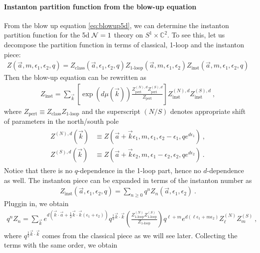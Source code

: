 \documentclass[letterpaper, 11pt]{article}
\def\IC{\mathbb{C}}
\def\CN{{\cal N}}
\def\e{\epsilon}
\def\half{\frac{1}{2}}
\begin{document}
\paragraph{Instanton partition function from the blow-up equation}
From the blow up equation \eqref{eq:blowup5d}, we can determine the instanton partition function for the 5d $\CN=1$ theory on $S^1 \times \IC^2$. To see this, let us decompose the partition function in terms of classical, 1-loop and the instanton piece:
\begin{align}
 Z(\vec{a}, m, \e_1, \e_2, q) = Z_{\textrm{class}}(\vec{a}, \e_1, \e_2, q) Z_{\textrm{1-loop}} (\vec{a}, m, \e_1, \e_2) Z_{\textrm{inst}}(\vec{a}, m, \e_1, \e_2, q)
\end{align}
Then the blow-up equation can be rewritten as
\begin{align}
 Z_{\textrm{inst}} = \sum_{\vec{k}} \left[ \exp\left( d \mu(\vec{k}) \right)  \frac{Z^{(N), d}_{\textrm{pert}} Z^{(S), d}_{\textrm{pert}}}{Z_{\textrm{pert}}} \right] Z^{(N), d}_{\textrm{inst}} Z^{(S), d}_{\textrm{inst}}  \ , 
\end{align}
where $Z_{\textrm{pert}} \equiv Z_{\textrm{class}} Z_{\textrm{1-loop}}$ and the superscript $(N/S)$ denotes appropriate shift of parameters in the north/south pole 
\begin{align}
\begin{split}
 Z^{(N), d}(\vec{k}) &\equiv Z(\vec{a}+\vec{k} \e_1, m, \e_1, \e_2-\e_1, q e^{d\e_1}) \ , \\
 Z^{(S), d}(\vec{k}) &\equiv Z(\vec{a}+\vec{k} \e_2, m, \e_1 - \e_2, \e_2, q e^{d\e_2}) \ . 
\end{split}
\end{align}
 Notice that there is no $q$-dependence in the 1-loop part, hence no $d$-dependence as well. 
The instanton piece can be expanded in terms of the instanton number as
\begin{align}
 Z_{\textrm{inst}} (\vec{a}, \e_1, \e_2, q) = \sum_{n \ge 0} q^n Z_n (\vec{a}, \e_1, \e_2) \ . 
\end{align}
Pluggin in, we obtain
\begin{align}
 q^n Z_n = \sum_{\vec{k}} e^{d\left( \vec{k} \cdot \vec{a} + \half \vec{k} \cdot \vec{k} (\e_1 + \e_2)\right)} q^{\half \vec{k}\cdot \vec{k}} \left( \frac{Z^{(N)}_{\textrm{1-loop}} Z^{(S)}_{\textrm{1-loop}}}{Z_{\textrm{1-loop}}} \right) q^{\ell + m} e^{d(\ell \e_1 + m \e_2)} Z^{(N)}_{\ell} Z^{(S)}_m  \ , 
\end{align}
where $q^{\half \vec{k} \cdot \vec{k}}$ comes from the classical piece as we will see later. Collecting the terms with the same order, we obtain
\end{document}
